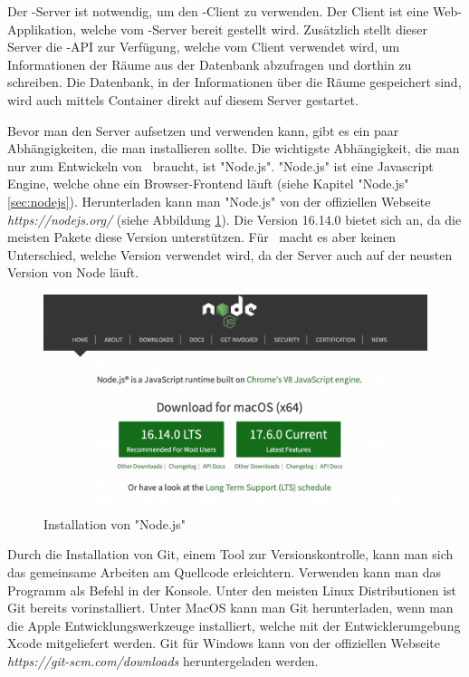 
Der \ZELIA-Server ist notwendig, um den \ZELIA-Client zu verwenden. Der Client ist eine Web-Applikation, welche vom \ZELIA-Server bereit gestellt wird. Zusätzlich stellt dieser Server die \ZELIA-API zur Verfügung, welche vom Client verwendet wird, um Informationen der Räume aus der Datenbank abzufragen und dorthin zu schreiben. Die Datenbank, in der Informationen über die Räume gespeichert sind, wird auch mittels Container direkt auf diesem Server gestartet.

\begin{minipage}{\textwidth}
    
    Bevor man den Server aufsetzen und verwenden kann, gibt es ein paar Abhängigkeiten, die man installieren sollte. Die wichtigste Abhängigkeit, die man nur zum Entwickeln von \ZELIA\ braucht, ist "Node.js". "Node.js" ist eine Javascript Engine, welche ohne ein Browser-Frontend läuft (siehe Kapitel "Node.js" \ref{sec:nodejs}). Herunterladen kann man "Node.js" von der offiziellen Webseite \emph{https://nodejs.org/} (siehe Abbildung \ref{fig:nodejsdownload}). Die Version 16.14.0 bietet sich an, da die meisten Pakete diese Version unterstützen. Für \ZELIA\ macht es aber keinen Unterschied, welche Version verwendet wird, da der Server auch auf der neusten Version von Node läuft.
\end{minipage}
    
\begin{figure}[H]
    \centering
    \includegraphics[width=120mm]{media/Handbuch/nodejs.png}
    \caption{Installation von "Node.js"}
    \label{fig:nodejsdownload}
\end{figure}


Durch die Installation von Git, einem Tool zur Versionskontrolle, kann man sich das gemeinsame Arbeiten am Quellcode erleichtern. Verwenden kann man das Programm als Befehl in der Konsole. Unter den meisten Linux Distributionen ist Git bereits vorinstalliert. Unter MacOS kann man Git herunterladen, wenn man die Apple Entwicklungswerkzeuge installiert, welche mit der Entwicklerumgebung Xcode mitgeliefert werden. Git für Windows kann von der offiziellen Webseite \emph{https://git-scm.com/downloads} heruntergeladen werden.

